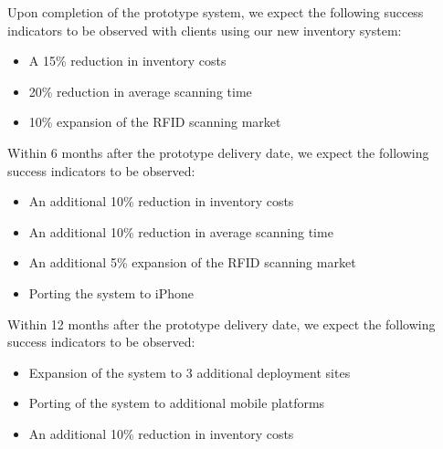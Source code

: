 Upon completion of the prototype system, we expect the following success indicators to be observed with clients using our new inventory system:
\begin{itemize}
  \item A 15\% reduction in inventory costs
  \item 20\% reduction in average scanning time
  \item 10\% expansion of the RFID scanning market
\end{itemize}

Within 6 months after the prototype delivery date, we expect the following success indicators to be observed:
\begin{itemize}
  \item An additional 10\% reduction in inventory costs
  \item An additional 10\% reduction in average scanning time
  \item An additional 5\% expansion of the RFID scanning market
  \item Porting the system to iPhone
\end{itemize}

Within 12 months after the prototype delivery date, we expect the following success indicators to be observed:
\begin{itemize}
  \item Expansion of the system to 3 additional deployment sites
  \item Porting of the system to additional mobile platforms
  \item An additional 10\% reduction in inventory costs
\end{itemize}
\\
